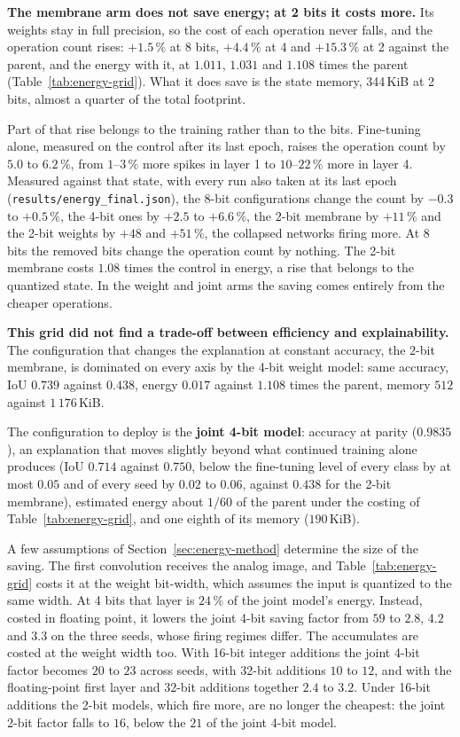 \textbf{The membrane arm does not save energy; at 2 bits it costs more.} Its
weights stay in full precision, so the cost of each operation never falls, and
the operation count rises: $+1.5\,\%$ at 8 bits, $+4.4\,\%$ at 4 and
$+15.3\,\%$ at 2 against the parent, and the energy with it, at $1.011$,
$1.031$ and $1.108$ times the parent (Table~\ref{tab:energy-grid}). What it does
save is the state memory, 344\,KiB at 2 bits, almost a quarter of the total
footprint.

Part of that rise belongs to the training rather than to the bits. Fine-tuning
alone, measured on the control after its last epoch, raises the operation count
by $5.0$ to $6.2\,\%$, from $1$--$3\,\%$ more spikes in layer 1 to
$10$--$22\,\%$ more in layer 4. Measured against that state, with every run also
taken at its last epoch (\texttt{results/energy\_final.json}), the 8-bit
configurations change the count by $-0.3$ to $+0.5\,\%$, the 4-bit ones by
$+2.5$ to $+6.6\,\%$, the 2-bit membrane by $+11\,\%$ and the 2-bit weights by
$+48$ and $+51\,\%$, the collapsed networks firing more. At 8 bits the removed
bits change the operation count by nothing. The 2-bit membrane costs $1.08$
times the control in energy, a rise that belongs to the quantized state. In the
weight and joint arms the saving comes entirely from the cheaper operations.

\textbf{This grid did not find a trade-off between efficiency and explainability.} 
The configuration that changes the explanation at constant accuracy, the
2-bit membrane, is dominated on every axis by the 4-bit weight model: same
accuracy, IoU $0.739$ against $0.438$, energy $0.017$ against $1.108$ times the
parent, memory $512$ against $1\,176$\,KiB. 

The configuration to deploy is the \textbf{joint 4-bit model}: accuracy at parity
($0.9835$), an explanation that moves slightly beyond what continued training
alone produces (IoU $0.714$ against $0.750$, below the fine-tuning level of every
class by at most $0.05$ and of every seed by $0.02$ to $0.06$, against $0.438$
for the 2-bit membrane), estimated energy about $1/60$ of the parent under the
costing of Table~\ref{tab:energy-grid}, and one eighth of its memory
($190$\,KiB).

A few assumptions of Section~\ref{sec:energy-method} determine the size of the
saving. The first convolution receives the analog image, and
Table~\ref{tab:energy-grid} costs it at the weight bit-width, which assumes the
input is quantized to the same width. At 4 bits that layer is $24\,\%$ of the
joint model's energy. Instead, costed in floating point, it lowers the joint 4-bit
saving factor from $59$ to $2.8$, $4.2$ and $3.3$ on the three seeds, whose
firing regimes differ. The accumulates are costed at the weight width too. With
16-bit integer additions the joint 4-bit factor becomes $20$ to $23$ across
seeds, with 32-bit additions $10$ to $12$, and with the floating-point first
layer and 32-bit additions together $2.4$ to $3.2$. Under 16-bit additions the
2-bit models, which fire more, are no longer the cheapest: the joint 2-bit factor
falls to $16$, below the $21$ of the joint 4-bit model.

